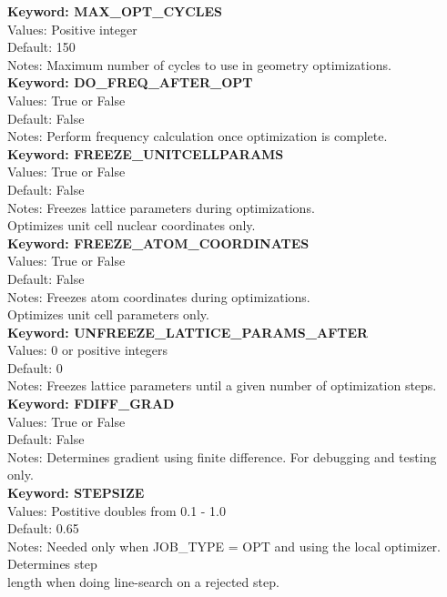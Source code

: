 \documentclass[11pt,letterpaper]{article}
\begin{document}
\begin{spacing}{1.0}
\noindent
\textbf{Keyword: MAX\_OPT\_CYCLES} \\
Values:  Positive integer \\
Default: 150 \\
Notes:   Maximum number of cycles to use in geometry optimizations.  \\


\noindent
\textbf{Keyword: DO\_FREQ\_AFTER\_OPT} \\
Values: True or False\\
Default: False\\
Notes: Perform frequency calculation once optimization is complete.\\ 


\noindent
\textbf{Keyword: FREEZE\_UNITCELLPARAMS} \\
Values:  True or False\\
Default: False \\
Notes:   Freezes lattice parameters during optimizations. \\
             Optimizes unit cell nuclear coordinates only.\\

 \noindent
\textbf{Keyword: FREEZE\_ATOM\_COORDINATES} \\
Values:  True or False\\
Default: False \\
Notes:   Freezes atom coordinates during optimizations.\\
             Optimizes unit cell parameters only.\\

 \noindent
\textbf{Keyword: UNFREEZE\_LATTICE\_PARAMS\_AFTER} \\
Values:  0 or positive integers\\
Default: 0 \\
Notes:   Freezes lattice parameters until a given number of
              optimization steps.\\

 \noindent
\textbf{Keyword: FDIFF\_GRAD} \\
Values:  True or False\\
Default: False \\
Notes:   Determines gradient using finite difference. For debugging and testing only.\\ 


\noindent
\textbf{Keyword: STEPSIZE} \\
Values: Postitive doubles from 0.1 - 1.0\\
Default: 0.65\\
Notes: Needed only when JOB\_TYPE = OPT and using the local optimizer. Determines step\\ 
              length when doing line-search on a rejected step.\\


\end{spacing}
\end{document}
